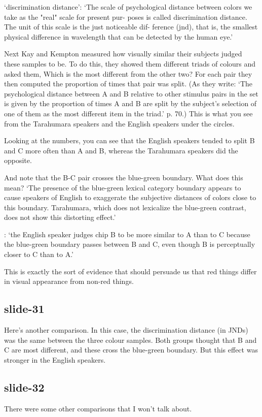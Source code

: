 \documentclass[12pt,\papersize]{extarticle}
\begin{document}
‘discrimination distance’:
‘The scale of psychological distance between colors we take as the "real" scale
for present pur- poses is called discrimination distance. The unit of this
scale is the just noticeable dif- ference (jnd), that is, the smallest physical
difference in wavelength that can be detected by the human eye.’
\citep[p.~68]{kay_what_1984}

Next Kay and Kempton measured how visually similar their subjects judged these
samples to be.
To do this, they showed them different triads of colours and asked them,
Which is the most different from the other two?
For each pair they then computed the proportion of times that pair was split.
(As they write: ‘The psychological distance between A and B relative to other
stimulus pairs in the set is given by the proportion of times A and B are split
by the subject's selection of one of them as the most different item in the
triad.’ p. 70.)
This is what you see from the Tarahumara speakers and the English speakers
under the circles.

Looking at the numbers, you can see that
the English speakers tended to split B and C more often than A and B,
whereas the Tarahumara speakers did the opposite.

And note that the B-C pair crosses the blue-green boundary.
What does this mean?
‘The presence of the blue-green lexical category boundary appears to cause
speakers of English to exaggerate the subjective distances of colors close to
this boundary. Tarahumara, which does not lexicalize the blue-green contrast,
does not show this distorting effect.’

\citep[p.~77]{kay_what_1984}:
‘the English speaker judges chip B to be more similar to A than to C because
the blue-green boundary passes between B and C, even though B is perceptually
closer to C than to A.’

This is exactly the sort of evidence that should persuade us
that red things differ in visual appearance from non-red things.

\subsection{slide-31}
Here’s another comparison.
In this case, the discrimination distance (in JNDs) was the same between
the three colour samples.
Both groups thought that B and C are most different, and these cross
the blue-green boundary.  But this effect was stronger in the English speakers.

\subsection{slide-32}
There were some other comparisons that I won’t talk about.
\end{document}
